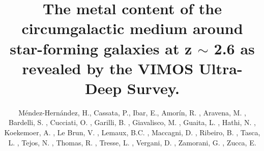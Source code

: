 \documentclass[longauth]{aa}
\begin{document}
 
   \title{The metal content of the circumgalactic medium around star-forming galaxies at z $\sim$ 2.6 as revealed by the VIMOS Ultra-Deep Survey.}
   \subtitle{}
   \author{M\'endez-Hern\'andez, H.,
          Cassata, P., %
          Ibar, E.,
          Amor\'in, R. ,
          Aravena, M. ,
          Bardelli, S. ,
          Cucciati, O. ,
          Garilli, B. ,
          Giavalisco, M. ,
          Guaita, L. ,
          Hathi, N. ,
          Koekemoer, A. ,
          Le Brun, V. ,
          Lemaux, B.C. ,
          Maccagni, D. ,
          Ribeiro, B. ,
          Tasca, L. ,
          Tejos, N. ,
          Thomas, R. ,
          Tresse, L. ,          
          Vergani, D. ,
          Zamorani, G. ,
          Zucca, E.  
          }
\end{document}
